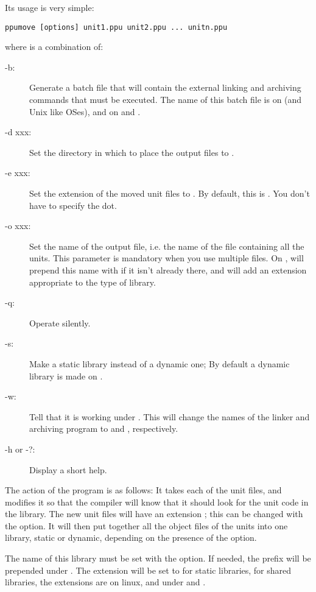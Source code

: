 Its usage is very simple:
\begin{verbatim}
ppumove [options] unit1.ppu unit2.ppu ... unitn.ppu
\end{verbatim}
where  is a combination of:
\begin{description}
\item[-b:\ ] Generate a batch file that will
contain the external linking and archiving commands that must be
executed. The name of this batch file is  on \linux (and Unix
like OSes), and  on \windows and \dos.
\item[-d xxx:\ ] Set the directory in which to place the output files to
.
\item[-e xxx:\ ] Set the extension of the moved unit files to .
By default, this is . You don't have to specify the dot.
\item[-o xxx:\ ] Set the name of the output file, i.e. the name of the file
containing all the units. This parameter is mandatory when you use multiple
files. On \linux,  will prepend this name with  if it isn't
already there, and will add an extension appropriate to the type of library.
\item [-q:\ ] Operate silently.
\item [-s:\ ] Make a static library instead of a
dynamic one; By default a dynamic library is made on \linux.
\item [-w:\ ] Tell  that it is working under \windowsnt. This will
change the names of the linker and archiving program to  and
, respectively.
\item[-h or -?:\ ] Display a short help.
\end{description}

The action of the  program is as follows:
It takes each of the unit files, and modifies it so that the compiler will
know that it should look for the unit code in the library. The new unit
files will have an extension ; this can be changed with the
 option. It will then put together all the object files of the units
into one library, static or dynamic, depending on the presence of the
 option.

The name of this library must be set with the  option.
If needed, the prefix  will be prepended under \linux.
The extension will be set to  for static libraries,
for shared libraries, the extensions are  on linux, and 
under \windowsnt and \ostwo.

